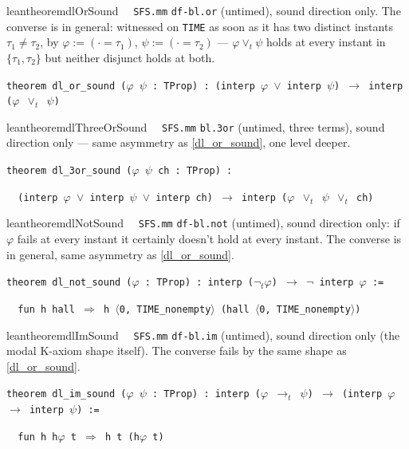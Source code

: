 \begin{restatable}{leantheorem}{dlOrSound}~~ \texttt{SFS.mm} \texttt{df-bl.or} (untimed), sound direction only. The converse is  in general: witnessed on \texttt{TIME} as soon as it has two distinct instants $\tau_1\ne\tau_2$, by $\varphi := (\cdot=\tau_1)$, $\psi := (\cdot=\tau_2)$ --- $\varphi\vee_t\psi$ holds at every instant in $\{\tau_1,\tau_2\}$ but neither disjunct holds at both.

\texttt{\textcolor{leancolor}{theorem} \textcolor{leanyellow}{dl\_or\_sound} ($\varphi$ $\psi$ : TProp) : (interp $\varphi$ $\vee$ interp $\psi$) $\to$ interp ($\varphi$ $\vee_t$ $\psi$)}
\label{dl_or_sound}
\end{restatable}

\begin{restatable}{leantheorem}{dlThreeOrSound}~~ \texttt{SFS.mm} \texttt{bl.3or} (untimed, three terms), sound direction only --- same asymmetry as \ref{dl_or_sound}, one level deeper.

\texttt{\textcolor{leancolor}{theorem} \textcolor{leanyellow}{dl\_3or\_sound} ($\varphi$ $\psi$ ch : TProp) :}

\texttt{~~(interp $\varphi$ $\vee$ interp $\psi$ $\vee$ interp ch) $\to$ interp ($\varphi$ $\vee_t$ $\psi$ $\vee_t$ ch)}
\label{dl_3or_sound}
\end{restatable}

\begin{restatable}{leantheorem}{dlNotSound}~~ \texttt{SFS.mm} \texttt{df-bl.not} (untimed), sound direction only: if $\varphi$ fails at every instant it certainly doesn't hold at every instant. The converse is  in general, same asymmetry as \ref{dl_or_sound}.

\texttt{\textcolor{leancolor}{theorem} \textcolor{leanyellow}{dl\_not\_sound} ($\varphi$ : TProp) : interp ($\neg_t$$\varphi$) $\to$ $\neg$ interp $\varphi$ :=}

\texttt{~~\textcolor{leancolor}{fun} h hall $\Rightarrow$ h $\langle$0, TIME\_nonempty$\rangle$ (hall $\langle$0, TIME\_nonempty$\rangle$)}
\label{dl_not_sound}
\end{restatable}

\begin{restatable}{leantheorem}{dlImSound}~~ \texttt{SFS.mm} \texttt{df-bl.im} (untimed), sound direction only (the modal K-axiom shape itself). The converse fails by the same shape as \ref{dl_or_sound}.

\texttt{\textcolor{leancolor}{theorem} \textcolor{leanyellow}{dl\_im\_sound} ($\varphi$ $\psi$ : TProp) : interp ($\varphi$ $\to_t$ $\psi$) $\to$ (interp $\varphi$ $\to$ interp $\psi$) :=}

\texttt{~~\textcolor{leancolor}{fun} h h$\varphi$ t $\Rightarrow$ h t (h$\varphi$ t)}
\label{dl_im_sound}
\end{restatable}

